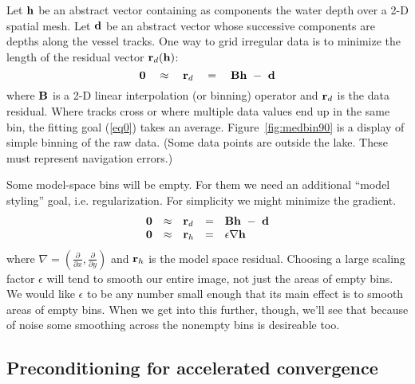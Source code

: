 Let $\bold{h}$ be an abstract vector containing as components
the water depth over a 2-D spatial mesh.
Let $\bold{d}$ be an abstract vector whose successive components
are depths along the vessel tracks.
One way to grid irregular data is to minimize the length 
of the residual vector $\bold r_d(\bold h)$:
\begin{equation}
	\bold 0 \quad\approx\quad \bold r_d \quad=\quad \bold B \bold h \ -\  \bold d    \label{eq0}
\end{equation}
where $\bold B$ is a 2-D linear interpolation (or binning) operator 
and $\bold r_d$ is the data residual.
Where tracks cross or where multiple data values end up in the same bin,
the fitting goal (\ref{eq0}) takes an average.
Figure~\ref{fig:medbin90}
is a display of simple binning of the raw data.
(Some data points are outside the lake.
These must represent navigation errors.)


\par

Some model-space bins will be empty.
For them we need an additional ``model styling'' goal,
i.e. regularization.
For simplicity we might minimize the gradient.
\begin{equation}
  \begin{array}{lllll}
    \bold 0 &\approx& \bold r_d &=& \bold B \bold h \ -\  \bold d \\
    \bold 0 &\approx& \bold r_h &=& \epsilon \nabla \bold h 
  \end{array} \label{eq1}
\end{equation}
where $\nabla=\left ( \frac{\partial}{\partial x},
\frac{\partial}{\partial y}\right)$ and $\bold r_h$ is the model space
residual.
Choosing a large scaling factor $\epsilon$ will tend to smooth
our entire image, not just the areas of empty bins.
We would like $\epsilon$ to be any number small enough
that its main effect is to smooth areas of empty bins.
When we get into this further, though, we'll see that
because of noise
some smoothing across the nonempty bins is desireable too.


\subsection{Preconditioning for accelerated convergence}

